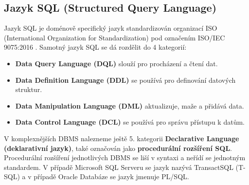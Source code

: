 \documentclass[czech,bachelor,public,dept460,male,cpdeclaration,twoside]{diploma}
\begin{document}
\subsection{Jazyk SQL (Structured Query Language)}
Jazyk SQL je doménově specifický jazyk standardizován organizací ISO (International Organization for Standardization) pod označením ISO/IEC 9075:2016 \cite{sqliso}. Samotný jazyk SQL se dá rozdělit do 4 kategorií:
\begin{itemize}
  \item \textbf{Data Query Language (DQL)} slouží pro procházení a čtení dat.
  \item \textbf{Data Definition Language (DDL)} se používá pro definování datových struktur.
  \item \textbf{Data Manipulation Language (DML)} aktualizuje, maže a přidává data.
  \item \textbf{Data Control Language (DCL)} se používá pro správu přístupu k datům.
\end{itemize}

V komplexnějších DBMS nalezneme ještě 5. kategorii \textbf{Declarative Language (deklarativní jazyk)}, také označován jako \textbf{procedurální rozšíření SQL}. Procedurální rozšíření jednotlivých DBMS se liší v syntaxi a neřídí se jednotným standardem. V případě Microsoft SQL Serveru se jazyk nazývá TransactSQL (T-SQL) a v případě Oracle Databáze se jazyk jmenuje PL/SQL.
\end{document}
